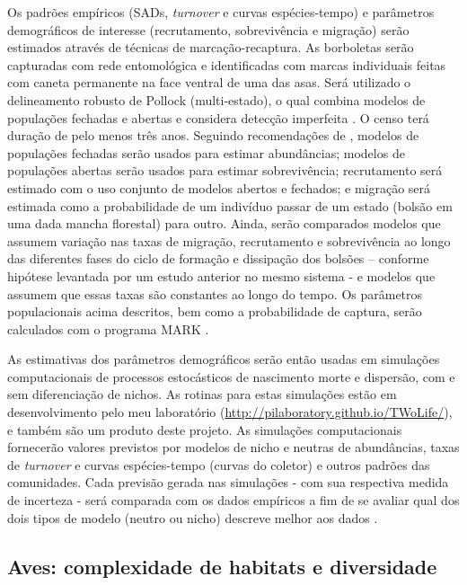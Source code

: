 \documentclass[12pt, A4]{article}
\begin{document}
Os padrões empíricos (SADs, \emph{turnover} e curvas espécies-tempo) e
parâmetros demográficos de interesse (recrutamento, sobrevivência e
migração) serão estimados através de técnicas de
marcação-recaptura. As borboletas serão capturadas com rede
entomológica e identificadas com marcas individuais feitas com caneta permanente na face ventral de uma
das asas. Será utilizado o delineamento
robusto de Pollock (multi-estado), o qual combina modelos de
populações fechadas e abertas e considera detecção imperfeita 
\citep{pollock2002,williams2002}. O censo terá duração de pelo menos
três anos.
Seguindo recomendações de
\citet{williams2002}, modelos de populações fechadas serão usados
para estimar abundâncias; modelos de populações abertas serão usados
para estimar sobrevivência; recrutamento será estimado com o uso
conjunto de modelos abertos e fechados; e migração será estimada como
a probabilidade de um indivíduo passar de um estado (bolsão em uma
dada mancha florestal) para outro. Ainda, serão comparados modelos que
assumem variação nas taxas de migração, recrutamento e sobrevivência
ao longo das diferentes fases do ciclo de formação e dissipação dos
bolsões – conforme hipótese levantada por um estudo anterior no mesmo
sistema - e modelos que assumem que essas taxas são
constantes ao longo do tempo. Os parâmetros populacionais acima
descritos, bem como a probabilidade de captura, serão calculados com o
programa MARK \citep{white2001}.

As estimativas dos parâmetros demográficos serão então usadas em
simulações computacionais de processos estocásticos de nascimento
morte e dispersão, com e sem diferenciação de nichos. As rotinas para
estas simulações estão em desenvolvimento pelo meu laboratório
(\url{http://pilaboratory.github.io/TWoLife/}), e também são um produto
deste projeto. As simulações computacionais fornecerão valores
previstos por modelos de nicho e neutras de abundâncias, taxas de
\emph{turnover} e curvas espécies-tempo (curvas do coletor) e outros padrões
das comunidades. Cada previsão gerada nas simulações - com sua
respectiva medida de incerteza - será comparada com os dados empíricos
a fim de se avaliar qual dos dois tipos de modelo (neutro ou nicho) descreve
melhor aos dados \citep{hartig2011}. 

\subsection{Aves: complexidade de habitats e diversidade}
\label{sec:compl-de-habit}
\end{document}
